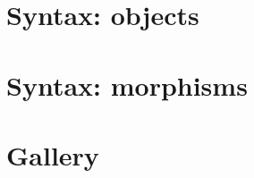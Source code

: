 


\newpage
\section{Syntax: objects}




\newpage
\section{Syntax: morphisms}




\newpage
\section{Gallery}




